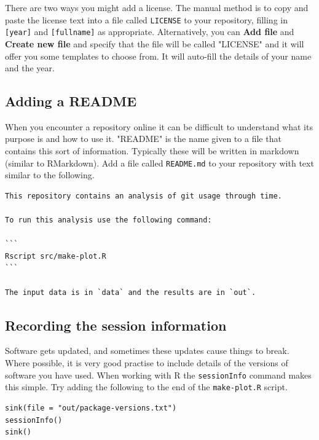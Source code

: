 \documentclass[11pt,onecolumn]{scrartcl}
\begin{document}
There are two ways you might add a license. The manual method is to copy and
paste the license text into a file called \texttt{LICENSE} to your repository, filling in
\texttt{[year]} and \texttt{[fullname]} as appropriate. Alternatively, you can \textbf{Add file} and \textbf{Create
new file} and specify that the file will be called "LICENSE" and it will offer
you some templates to choose from. It will auto-fill the details of your name
and the year.

\subsection{Adding a README}
\label{sec:org49947a3}

When you encounter a repository online it can be difficult to understand what
its purpose is and how to use it. "README" is the name given to a file that
contains this sort of information. Typically these will be written in markdown
(similar to RMarkdown). Add a file called \texttt{README.md} to your repository with text
similar to the following.

\lstset{language=sh,label= ,caption= ,captionpos=b,numbers=none}
\begin{lstlisting}
This repository contains an analysis of git usage through time.

To run this analysis use the following command:

```
Rscript src/make-plot.R
```

The input data is in `data` and the results are in `out`.
\end{lstlisting}

\subsection{Recording the session information}
\label{sec:org3d977e1}

Software gets updated, and sometimes these updates cause things to break. Where
possible, it is very good practise to include details of the versions of
software you have used. When working with R the \texttt{sessionInfo} command makes this
simple. Try adding the following to the end of the \texttt{make-plot.R} script.

\lstset{language=r,label= ,caption= ,captionpos=b,numbers=none}
\begin{lstlisting}
sink(file = "out/package-versions.txt")
sessionInfo()
sink()
\end{lstlisting}
\end{document}
